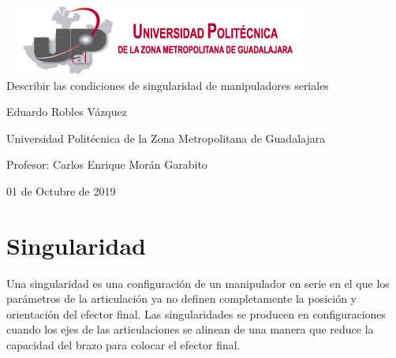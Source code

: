 \documentclass[11pt,a4paper,oldfontcommands,oneside]{memoir}
\begin{document}
%
%
\thispagestyle{empty}

{%
\sffamily
\centering
\Large

~\vspace{\fill}
\includegraphics[scale=1]{logo.png} \\
{\huge 
\vspace{4cm}
Describir las condiciones de singularidad de manipuladores seriales
}
\vspace{2.5cm}

{\LARGE
Eduardo Robles Vázquez
}

\vspace{2.5cm}

Universidad Politécnica de la Zona Metropolitana de Guadalajara

\vspace{3.5cm}

Profesor: Carlos Enrique Morán Garabito

\vspace{\fill}

01 de Octubre de 2019

}%

\vspace{.5cm}
\hfill\break




\tableofcontents*

\clearpage


\chapter{Singularidad}
Una singularidad es una configuración de un manipulador en serie en el que los parámetros de la articulación ya no definen completamente la posición y orientación del efector final. Las singularidades se producen en configuraciones cuando los ejes de las articulaciones se alinean de una manera que reduce la capacidad del brazo para colocar el efector final.\\
\end{document}
